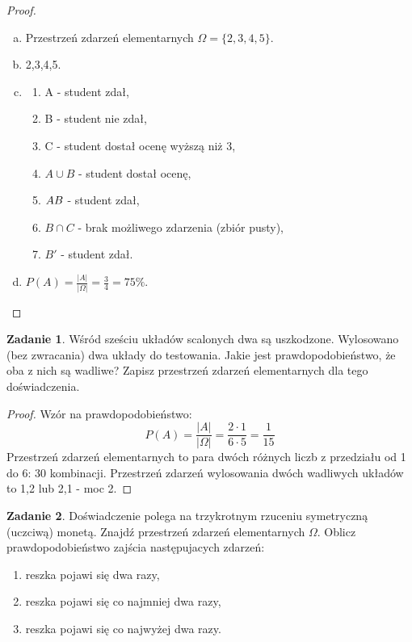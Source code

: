 \documentclass[11pt]{article}
\theoremstyle{definition}
\newtheorem{zadanie}{Zadanie}
\numberwithin{zadanie}{section}
\begin{document}
\begin{proof}
    \begin{enumerate}[a)]
        \item Przestrzeń zdarzeń elementarnych $\Omega = \{2,3,4,5\}$.
        \item 2,3,4,5.
        \item \begin{enumerate}
                  \item A - student zdał,
                  \item B - student nie zdał,
                  \item C - student dostał ocenę wyższą niż 3,
                  \item $A\cup B$ - student dostał ocenę,
                  \item $A\\B$ - student zdał,
                  \item $B\cap C$ - brak możliwego zdarzenia (zbiór pusty),
                  \item $B'$ - student zdał.
              \end{enumerate}
        \item $P(A) = \frac{|A|}{|\Omega|} = \frac{3}{4} = 75\%$.
    \end{enumerate}
\end{proof}

\begin{zadanie}
    Wśród sześciu układów scalonych dwa są uszkodzone. Wylosowano (bez zwracania) dwa układy do testowania. Jakie jest prawdopodobieństwo, że oba z nich są wadliwe? Zapisz przestrzeń zdarzeń elementarnych dla tego doświadczenia.
\end{zadanie}
\begin{proof}
    Wzór na prawdopodobieństwo:
    $$P(A) = \frac{|A|}{|\Omega|} = \frac{{2\cdot 1}}{6\cdot 5} = \frac{1}{15}$$
    Przestrzeń zdarzeń elementarnych to para dwóch różnych liczb z przedziału od 1 do 6: 30 kombinacji. Przestrzeń zdarzeń wylosowania dwóch wadliwych układów to 1,2 lub 2,1 - moc 2.
\end{proof}

\begin{zadanie}
    Doświadczenie polega na trzykrotnym rzuceniu symetryczną (uczciwą) monetą. Znajdź przestrzeń zdarzeń elementarnych $\Omega$. Oblicz prawdopodobieństwo zajścia następujacych zdarzeń:
    \begin{enumerate}
        \item reszka pojawi się dwa razy,
        \item reszka pojawi się co najmniej dwa razy,
        \item reszka pojawi się co najwyżej dwa razy.
    \end{enumerate}
\end{zadanie}
\end{document}
